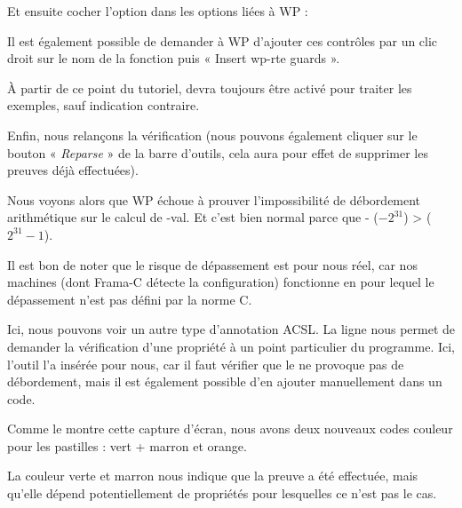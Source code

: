 Et ensuite cocher l'option  dans les options liées à WP :




Il est également possible de demander à WP d'ajouter ces
contrôles par un clic droit sur le nom de la fonction puis
« Insert wp-rte guards ».


\begin{Information}
  À partir de ce point du tutoriel,  devra toujours être
  activé pour traiter les exemples, sauf indication contraire.
\end{Information}


Enfin, nous relançons la vérification (nous pouvons également cliquer sur le
bouton « \textit{Reparse} » de la barre d'outils, cela aura pour effet de supprimer les
preuves déjà effectuées).



Nous voyons alors que WP échoue à prouver  l'impossibilité de
débordement arithmétique sur le calcul de -val. Et c'est bien normal parce
que - ($-2^{31}$) >  ($2^{31}-1$).





\begin{Information}
Il est bon de noter que le risque de dépassement est pour nous réel, car nos
machines (dont Frama-C détecte la configuration) fonctionne en
pour lequel le dépassement n'est pas défini par la norme C.
\end{Information}


Ici, nous pouvons voir un autre type d'annotation ACSL. La
ligne  nous permet de demander la vérification
d'une propriété à un point particulier du programme. Ici, l'outil l'a
insérée pour nous, car il faut vérifier que le  ne provoque pas de
débordement, mais il est également possible d'en ajouter manuellement dans
un code.



Comme le montre cette capture d'écran, nous avons deux nouveaux codes couleur
pour les pastilles : vert + marron et orange.



La couleur verte et marron nous indique que la preuve a été effectuée, mais
qu'elle dépend potentiellement de propriétés pour lesquelles ce n'est pas le
cas.



